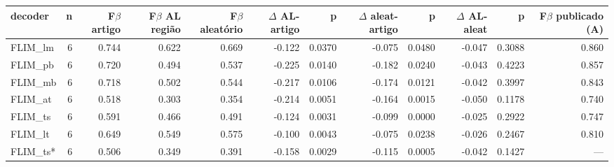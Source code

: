 \begin{adjustbox}{max width=\linewidth}
\begin{tabular}{lrrrrrrrrrrr}
\toprule
decoder & n & F$\beta$ artigo & F$\beta$ AL região & F$\beta$ aleatório & $\Delta$ AL-artigo & p & $\Delta$ aleat-artigo & p  & $\Delta$ AL-aleat & p   & F$\beta$ publicado (A) \\
\midrule
FLIM\_lm & 6 & 0.744 & 0.622 & 0.669 & -0.122 & 0.0370 & -0.075 & 0.0480 & -0.047 & 0.3088 & 0.860 \\
FLIM\_pb & 6 & 0.720 & 0.494 & 0.537 & -0.225 & 0.0140 & -0.182 & 0.0240 & -0.043 & 0.4223 & 0.857 \\
FLIM\_mb & 6 & 0.718 & 0.502 & 0.544 & -0.217 & 0.0106 & -0.174 & 0.0121 & -0.042 & 0.3997 & 0.843 \\
FLIM\_at & 6 & 0.518 & 0.303 & 0.354 & -0.214 & 0.0051 & -0.164 & 0.0015 & -0.050 & 0.1178 & 0.740 \\
FLIM\_ts & 6 & 0.591 & 0.466 & 0.491 & -0.124 & 0.0031 & -0.099 & 0.0000 & -0.025 & 0.2922 & 0.747 \\
FLIM\_lt & 6 & 0.649 & 0.549 & 0.575 & -0.100 & 0.0043 & -0.075 & 0.0238 & -0.026 & 0.2467 & 0.810 \\
FLIM\_ts* & 6 & 0.506 & 0.349 & 0.391 & -0.158 & 0.0029 & -0.115 & 0.0005 & -0.042 & 0.1427 & --- \\
\bottomrule
\end{tabular}
\end{adjustbox}
